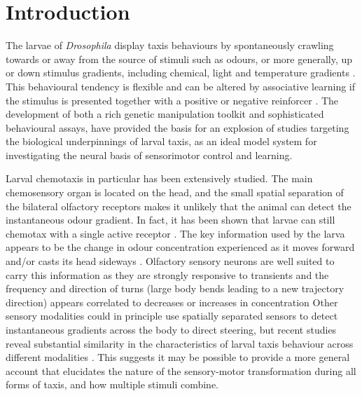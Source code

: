 \documentclass[10pt,a4paper]{article}
\newcommand{\Dros }{\emph{Drosophila }}
\begin{document}
\section{Introduction}
The larvae of \Dros display taxis behaviours by spontaneously crawling towards or away from the source of stimuli such as odours, or more generally, up or down stimulus gradients, including chemical, light and temperature gradients \citep{luo2010navigational,gomez2011active,gomez2012active,gomez2014multilevel,kane2013sensorimotor,klein2015sensory}. This behavioural tendency is flexible and can be altered by associative learning if the stimulus is presented together with a positive or negative reinforcer \citep{ache2005olfaction,scherer2003olfactory,gerber2004engram,diegelmann2013maggot,schleyer2015learning}. The development of both a rich genetic manipulation toolkit and sophisticated behavioural assays, \citep{gerber2009smelling,diegelmann2013maggot} 
have provided the basis for an explosion of studies targeting the biological underpinnings of larval taxis, as an ideal model system for investigating the neural basis of sensorimotor control and learning.

Larval chemotaxis in particular has been extensively studied. The main chemosensory organ is located on the head, and the small spatial separation of the bilateral olfactory receptors makes it unlikely that the animal can detect the instantaneous odour gradient. In fact, it has been shown that larvae can still chemotax with a single active receptor  \citep{fishilevich2005chemotaxis,gomez2010mechanisms,louis2008bilateral}. The key information used by the larva  appears to be the change in odour concentration experienced as it moves forward and/or casts its head sideways \citep{gomez2010mechanisms}. 
Olfactory sensory neurons are well suited to carry this information as they are strongly responsive to transients\citep{de2013common,nagel2011biophysical,kim2011system,schulze2015dynamical} and the frequency and direction of turns (large body bends leading to a new trajectory direction) appears correlated to  decreases or increases in concentration  \citep{hernandez2015reverse,schulze2015dynamical}
  Other sensory modalities could in principle use spatially separated sensors to detect instantaneous gradients across the body to direct steering, but%
 recent studies reveal substantial similarity in the characteristics of larval taxis behaviour across different modalities \citep{gepner2015computations, bellmann2010optogenetically, lahiri2011two}. This suggests it may be possible to provide a more general account that elucidates the nature of the sensory-motor transformation during all forms of taxis, and how multiple stimuli combine. 
\end{document}
